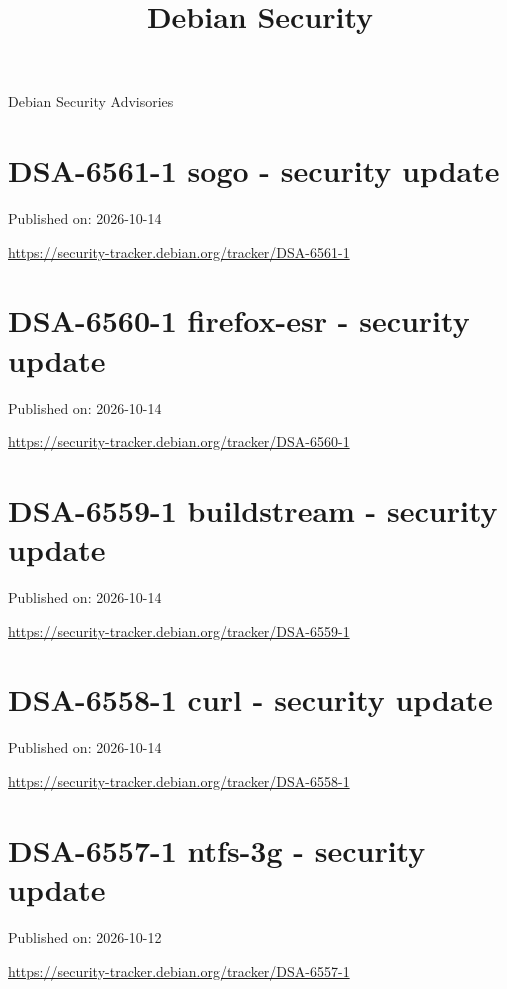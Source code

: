 \documentclass[11pt,a4paper]{article}
\title{Debian Security}
\begin{document}
\maketitle

Debian Security Advisories

\section{DSA-6561-1 sogo - security update}

Published on: 2026-10-14

\href{https://security-tracker.debian.org/tracker/DSA-6561-1}{https://security-tracker.debian.org/tracker/DSA-6561-1}

\section{DSA-6560-1 firefox-esr - security update}

Published on: 2026-10-14

\href{https://security-tracker.debian.org/tracker/DSA-6560-1}{https://security-tracker.debian.org/tracker/DSA-6560-1}

\section{DSA-6559-1 buildstream - security update}

Published on: 2026-10-14

\href{https://security-tracker.debian.org/tracker/DSA-6559-1}{https://security-tracker.debian.org/tracker/DSA-6559-1}

\section{DSA-6558-1 curl - security update}

Published on: 2026-10-14

\href{https://security-tracker.debian.org/tracker/DSA-6558-1}{https://security-tracker.debian.org/tracker/DSA-6558-1}

\section{DSA-6557-1 ntfs-3g - security update}

Published on: 2026-10-12

\href{https://security-tracker.debian.org/tracker/DSA-6557-1}{https://security-tracker.debian.org/tracker/DSA-6557-1}
\end{document}

